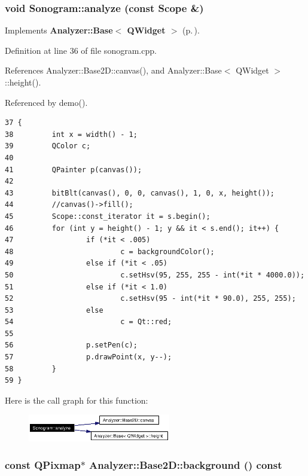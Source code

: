 \subsubsection{\setlength{\rightskip}{0pt plus 5cm}void Sonogram::analyze (const Scope \&)\hspace{0.3cm}{\tt  [virtual]}}\label{classSonogram_Sonograma3}




Implements {\bf Analyzer::Base$<$ QWidget $>$} {\rm (p.\,\pageref{classAnalyzer_1_1Base_Analyzer_1_1Baseb3})}.

Definition at line 36 of file sonogram.cpp.

References Analyzer::Base2D::canvas(), and Analyzer::Base$<$ QWidget $>$::height().

Referenced by demo().



\footnotesize\begin{verbatim}37 {
38         int x = width() - 1;
39         QColor c;
40         
41         QPainter p(canvas());
42 
43         bitBlt(canvas(), 0, 0, canvas(), 1, 0, x, height());
44         //canvas()->fill();
45         Scope::const_iterator it = s.begin();
46         for (int y = height() - 1; y && it < s.end(); it++) {
47                 if (*it < .005)
48                         c = backgroundColor();
49                 else if (*it < .05)
50                         c.setHsv(95, 255, 255 - int(*it * 4000.0));
51                 else if (*it < 1.0)
52                         c.setHsv(95 - int(*it * 90.0), 255, 255);
53                 else
54                         c = Qt::red;
55 
56                 p.setPen(c);
57                 p.drawPoint(x, y--);
58         }
59 }
\end{verbatim}\normalsize 


Here is the call graph for this function:\begin{figure}[H]
\begin{center}
\leavevmode
\includegraphics[width=176pt]{classSonogram_Sonograma3_cgraph}
\end{center}
\end{figure}
\subsubsection{\setlength{\rightskip}{0pt plus 5cm}const QPixmap$\ast$ Analyzer::Base2D::background () const\hspace{0.3cm}{\tt  [inline, inherited]}}\label{classAnalyzer_1_1Base2D_Sonograma6}




